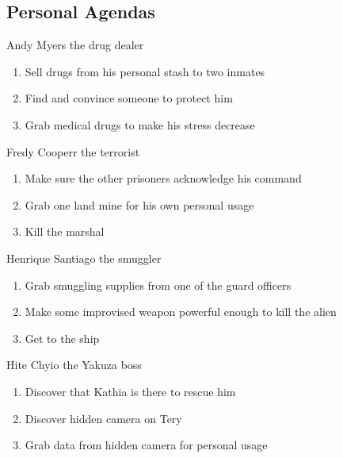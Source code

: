 \subsection{Personal Agendas}


 
\begin{rpg-commentbox}{Andy Myers the drug dealer}
    \begin{enumerate}[label=\textbf{Act \arabic*}, leftmargin=1cm]
        \item Sell drugs from his personal stash to two inmates
        \item Find and convince someone to protect him
        \item Grab medical drugs to make his stress decrease
    \end{enumerate}
\end{rpg-commentbox}

\begin{rpg-commentbox}{Fredy Cooperr the terrorist}
    \begin{enumerate}[label=\textbf{Act \arabic*}, leftmargin=1cm]
        \item Make sure the other prisoners acknowledge his command
        \item Grab one land mine for his own personal usage
        \item Kill the marshal
    \end{enumerate}
\end{rpg-commentbox}


\begin{rpg-commentbox}{Henrique Santiago the smuggler}
    \begin{enumerate}[label=\textbf{Act \arabic*}, leftmargin=1cm]
        \item Grab smuggling supplies from one of the guard officers
        \item Make some improvised weapon powerful enough to kill the alien
        \item Get to the ship
    \end{enumerate}
\end{rpg-commentbox}

\begin{rpg-commentbox}{Hite Chyio the Yakuza boss}
    \begin{enumerate}[label=\textbf{Act \arabic*}, leftmargin=1cm]
        \item Discover that Kathia is there to rescue him
        \item Discover hidden camera on Tery
        \item Grab data from hidden camera for personal usage
    \end{enumerate}
    
\end{rpg-commentbox}

